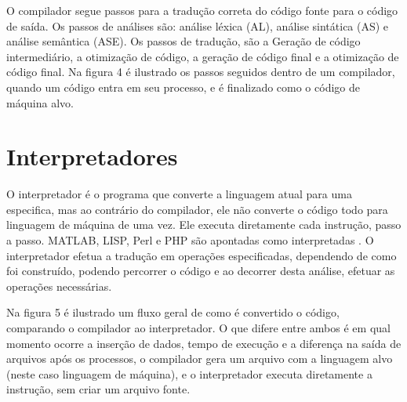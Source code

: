 \documentclass[12pt,oneside,a4paper,chapter=TITLE,section=TITLE,sumario=tradicional]{abntex2}
\begin{document}
\begin{figure}[htb]
\end{figure}

O compilador segue passos para a tradução correta do código fonte para o código de saída. Os passos de análises são: análise léxica (AL), análise sintática (AS) e análise semântica (ASE). Os passos de tradução, são a Geração de código intermediário, a otimização de código, a geração de código final e a otimização de código final. Na figura 4 é ilustrado os passos seguidos dentro de um compilador, quando um código entra em seu processo, e é finalizado como o código de máquina alvo.

\begin{figure}[htb]
\end{figure}


\section{Interpretadores}
\label{sec:interpretadores}

O interpretador é o programa que converte a linguagem atual para uma especifica, mas ao contrário do compilador, ele não converte o código todo para linguagem de máquina de uma vez. Ele executa diretamente cada instrução, passo a passo. MATLAB, LISP, Perl e PHP são apontadas como interpretadas \cite{penelope2019}.  O interpretador efetua a tradução em operações especificadas, dependendo de como foi construído, podendo percorrer o código e ao decorrer desta análise, efetuar as operações necessárias. 

Na figura 5 é ilustrado um fluxo geral de como é convertido o código, comparando o compilador ao interpretador. O que difere entre ambos é em qual momento ocorre a inserção de dados, tempo de execução e a diferença na saída de arquivos após os processos, o compilador gera um arquivo com a linguagem alvo (neste caso linguagem de máquina), e o interpretador executa diretamente a instrução, sem criar um arquivo fonte.

\begin{figure}[htb]
\end{figure}
\end{document}
